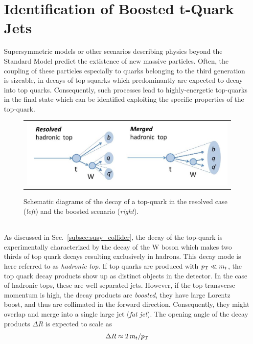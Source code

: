 \section{Identification of Boosted t-Quark Jets }
\label{sec:boosted_tops}
Supersymmetric models or other scenarios describing physics beyond the Standard Model predict the extistence of new massive particles. Often, the coupling of these particles especially to quarks belonging to the third generation is sizeable, \eg in decays of top squarks which predominantly are expected to decay into top quarks. Consequently, such processes lead to highly-energetic top-quarks in the final state which can be identified exploiting the specific properties of the top-quark. 
\begin{figure}[!tp]
  \centering 
  \begin{tabular}{c}
    \includegraphics[width=1.0\textwidth]{figures/BoostedTops.jpg} 
  \end{tabular}
  \caption{Schematic diagrams of the decay of a top-quark in the resolved case (\textit{left}) and the boosted scenario (\textit{right}).}
  \label{fig:boosted_top}
\end{figure}
\\
As discussed in Sec.~\ref{subsec:susy_collider}, the decay of the top-quark is experimentally characterized by the decay of the W boson which makes two thirds of top quark decays resulting exclusively in hadrons. This decay mode is here referred to as \textit{hadronic top}. If top quarks are produced with $p_{\text{T}} \ll m_t$, the top quark decay products show up as distinct objects in the detector. In the case of hadronic tops, these are well separated jets. However, if the top transverse momentum is high, the decay products are \textit{boosted}, \ie they have large Lorentz boost, and thus are collimated in the forward direction. Consequently, they might overlap and merge into a single large jet (\textit{fat jet}). The opening angle of the decay products $\Delta R$ is expected to scale as
\begin{equation}
 \Delta R \approx 2\,m_{t} /p_{\text{T}}
 \label{eq:rule-of-thumb}
\end{equation}  
